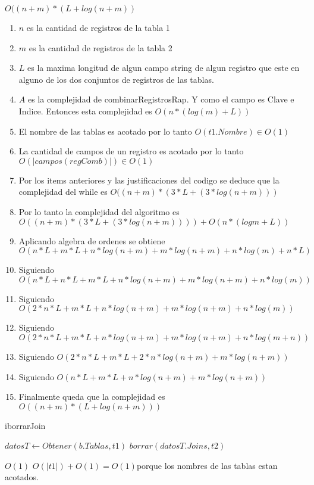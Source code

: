 \begin{Algoritmos}
\datosAlgoritmo{} %
{} %
{} %
{$O((n+m)*(L+log(n+m))$} %
{\begin{enumerate}
\item $n$ es la cantidad de registros de la tabla 1
\item $m$ es la cantidad de registros de la tabla 2
\item $L$ es la maxima longitud de algun campo string de algun registro que este en alguno de los dos conjuntos de registros de las tablas.
\item $A$ es la complejidad de combinarRegistrosRap. Y como el campo es Clave e Indice. Entonces esta complejidad es $O(n*(log(m) + L))$
\item El nombre de las tablas es acotado por lo tanto $O(t1.Nombre) \in O(1)$
\item La cantidad de campos de un registro es acotado por lo tanto $O(|campos(regComb)|) \in O(1)$
\item Por los items anteriores y las justificaciones del codigo se deduce que la complejidad del while es $O((n+m)*(3*L+(3*log(n+m)))$
\item Por lo tanto la complejidad del algoritmo es $O((n+m)*(3*L+(3*log(n+m)))) + O(n*(log m + L))$
\item Aplicando algebra de ordenes se obtiene $O(n*L + m*L + n*log(n+m) + m*log(n+m) + n*log(m) + n*L)$
\item Siguiendo $O(n*L +n*L + m*L + n*log(n+m) + m*log(n+m) + n*log(m))$
\item Siguiendo $O(2*n*L + m*L + n*log(n+m) + m*log(n+m) + n*log(m))$
\item Siguiendo $O(2*n*L + m*L + n*log(n+m) + m*log(n+m) + n*log(m+n))$
\item Siguiendo $O(2*n*L + m*L + 2*n*log(n+m) + m*log(n+m))$
\item Siguiendo $O(n*L + m*L + n*log(n+m) + m*log(n+m))$
\item Finalmente queda que la complejidad es $O((n+m)*(L + log(n+m)))$
\end{enumerate}} %

\begin{algoritmo}{iborrarJoin}{  }{}

    $datosT \gets Obtener(b.Tablas, t1)$ 
    $borrar(datosT.Joins, t2)$
    
\end{algoritmo}

\datosAlgoritmo{} %
{} %
{} %
{$O(1)$} %
{$O(|t1|) + O(1) = O(1) $porque los nombres de las tablas estan acotados.} %


\end{Algoritmos}
